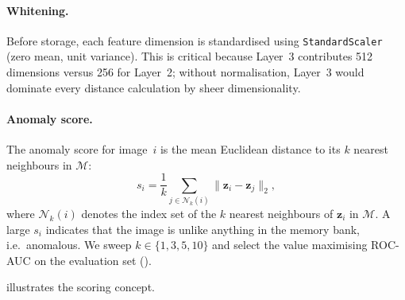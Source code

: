 \paragraph{Whitening.}
Before storage, each feature dimension is standardised using
\texttt{StandardScaler} (zero mean, unit variance).  This is critical
because Layer~3 contributes 512 dimensions versus 256 for Layer~2;
without normalisation, Layer~3 would dominate every distance
calculation by sheer dimensionality.

\paragraph{Anomaly score.}
The anomaly score for image~$i$ is the mean Euclidean distance to its
$k$ nearest neighbours in $\mathcal{M}$:
\begin{equation}
  s_i = \frac{1}{k}\sum_{j \in \mathcal{N}_k(i)}
        \|\mathbf{z}_i - \mathbf{z}_j\|_2,
\label{eq:score}
\end{equation}
where $\mathcal{N}_k(i)$ denotes the index set of the $k$ nearest
neighbours of $\mathbf{z}_i$ in $\mathcal{M}$.  A large $s_i$ indicates
that the image is unlike anything in the memory bank, i.e.\ anomalous.
We sweep $k \in \{1, 3, 5, 10\}$ and select the value maximising
ROC-AUC on the evaluation set ().

 illustrates the scoring concept.

